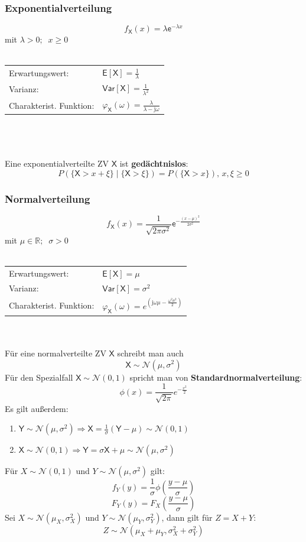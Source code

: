 \documentclass[a4paper,twocolumn,10pt]{article}
\newenvironment{iii}{\begin{enumerate}[label={\roman{*})}]}{\end{enumerate}}
\newcommand{\varX}{\mathsf{Var[X]}}
\newcommand{\erwX}{\mathsf{E[X]}}
\newcommand{\e}{\mathsf{e}}
\newcommand{\X}{\mathsf{X}}
\newcommand{\im}{\mathrm{j}}
\begin{document}
\subsubsection{Exponentialverteilung}
\[f_\X(x) =\lambda \e^{-\lambda x}\]
mit $\lambda > 0;\;\;x \geq 0$\\\\
\begin{tabular}{ll}
Erwartungswert: &$\erwX=\frac{1}{\lambda}$\\
Varianz: &$\varX=\frac{1}{\lambda^2}$\\
Charakterist. Funktion: &$\varphi_\X(\omega)=\frac{\lambda}{\lambda-\im\omega}$
\end{tabular}\\\\\\
Eine exponentialverteilte ZV $\X$ ist \textbf{gedächtnislos}:
\[P(\{\mathsf X > x + \xi\} \mid \{\mathsf X > \xi\}) = P(\{\mathsf X > x\}),\, x, \xi \geq 0\]

\subsubsection{Normalverteilung}
\[f_\X(x) = \frac{1}{\sqrt{2\pi\sigma^2}}  \e^{-\frac{(x - \mu)^2}{2 \sigma^2}}\]
mit $\mu\in\mathbb{R};\;\;\sigma > 0$\\\\
\begin{tabular}{ll}
Erwartungswert: &$\erwX=\mu$\\
Varianz: &$\varX=\sigma^2$\\
Charakterist. Funktion: &$\varphi_\X(\omega)=e^{(\im\omega\mu-\frac{\omega^2\sigma^2}{2})}$
\end{tabular}\\\\
Für eine normalverteilte ZV $\mathsf X$ schreibt man auch
\[\mathsf X \sim \mathcal N(\mu, \sigma^2)\]
Für den Spezialfall $\mathsf X \sim \mathcal N(0, 1)$ spricht man von \textbf{Standardnormalverteilung}:
\[\phi(x)=\frac{1}{\sqrt{2\pi}}e^{-\frac{x^2}{2}}\]
Es gilt außerdem:
\begin{iii}
\item $\mathsf Y \sim \mathcal N(\mu, \sigma^2) \Rightarrow \mathsf X = \frac{1}{\sigma}(\mathsf Y-\mu) \sim \mathcal N(0, 1)$
\item $\mathsf X \sim \mathcal N(0, 1) \Rightarrow \mathsf Y = \sigma\mathsf X + \mu \sim \mathcal N(\mu, \sigma^2)$
\end{iii}
Für $X\sim\mathcal{N}(0,1)$ und $Y\sim\mathcal{N}(\mu,\sigma^2)$ gilt:
\[f_Y(y)=\frac{1}{\sigma}\phi\left(\frac{y-\mu}{\sigma}\right)\]
\[F_Y(y)=F_X\left(\frac{y-\mu}{\sigma}\right)\]
Sei $X\sim\mathcal{N}(\mu_X,\sigma_X^2)$ und $Y\sim\mathcal{N}(\mu_Y,\sigma_Y^2)$, dann gilt für $Z=X+Y$:
\[Z\sim\mathcal{N}(\mu_X+\mu_Y,\sigma_X^2+\sigma_Y^2)\]
\end{document}
